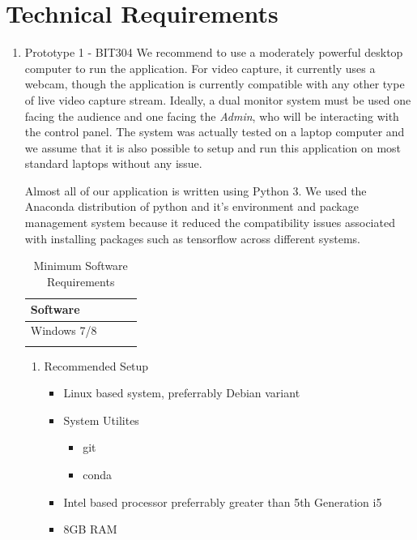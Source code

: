 \documentclass[12pt,a4paper,man]{report}
\begin{document}
\section{Technical Requirements}
\label{sec:orgc394d16}
\begin{enumerate}
\item Prototype 1 - BIT304
\label{sec:org1fc4077}
We recommend to use a moderately powerful desktop computer to run the application. For video capture, it currently uses a webcam, though the application is currently compatible with any other type of live video capture stream. Ideally, a dual monitor system must be used one facing the audience and one facing the \emph{Admin}, who will be interacting with the control panel. The system was actually tested on a laptop computer and we assume that it is also possible to setup and run this application on most standard laptops without any issue. 

Almost all of our application is written using Python 3. We used the Anaconda distribution of python and it's environment and package management system because it reduced the compatibility issues associated with installing packages such as tensorflow across different systems. 

\begin{table}[htbp]
\caption{\label{table:minreq1}
Minimum Software Requirements}
\centering
\begin{tabular}{|l|l|lp{3cm}|}
Software\\
\hline
Windows 7/8\\
\\
\end{tabular}
\end{table}

\begin{enumerate}
\item Recommended Setup
\label{sec:org9f06ac2}
\begin{itemize}
\item Linux based system, preferrably Debian variant
\item System Utilites
\begin{itemize}
\item git
\item conda
\end{itemize}
\item Intel based processor preferrably greater than 5th Generation i5
\item 8GB RAM
\end{itemize}
\end{enumerate}
\end{enumerate}
\end{document}
